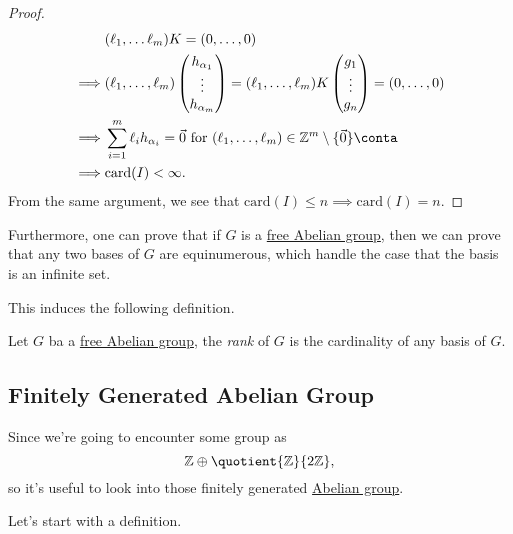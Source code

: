 \begin{proof}
\[\begin{split}
			&(\ell _1, \ldots \ell _{m}  )K = (0, \ldots , 0 )\\
			\implies &(\ell _1, \ldots , \ell _{m}  )\begin{pmatrix}
				h_{\alpha _1} \\
				\vdots        \\
				h_{\alpha _m} \\
			\end{pmatrix} = (\ell _1, \ldots , \ell _m )K \begin{pmatrix}
				g_1    \\
				\vdots \\
				g_n    \\
			\end{pmatrix} = (0, \ldots , 0)\\
			\implies &\sum\limits_{i=1}^{m} \ell _{i} h_{\alpha _{i} }= \vec{0} \text{ for \((\ell_1, \ldots, \ell_m)\in \mathbb{Z}^m\setminus \{\vec{0}\}\)} \conta\\
			\implies &\mathrm{card} (I) < \infty.
		\end{split}
	\]
	From the same argument, we see that \(\mathrm{card} (I) \leq n\implies \mathrm{card} (I) = n\).
\end{proof}

\begin{remark}
	Furthermore, one can prove that if \(G\) is a \hyperref[def:free-Abelian-group]{free Abelian group}, then we can prove that any two bases of \(G\) are equinumerous, which
	handle the case that the basis is an infinite set.
\end{remark}
This induces the following definition.

\begin{definition}[Rank]\label{def:rank}
	Let \(G\) ba a \hyperref[def:free-Abelian-group]{free Abelian group}, the \emph{rank} of \(G\) is the cardinality of any basis of \(G\).
\end{definition}


\subsection{Finitely Generated Abelian Group}
Since we're going to encounter some group as
\[
	\mathbb{\MakeUppercase{z}} \oplus \quotient{\mathbb{\MakeUppercase{z}}}{2\mathbb{\MakeUppercase{z}} },
\]
so it's useful to look into those finitely generated \hyperref[def:Abelian-group]{Abelian group}.

Let's start with a definition.

